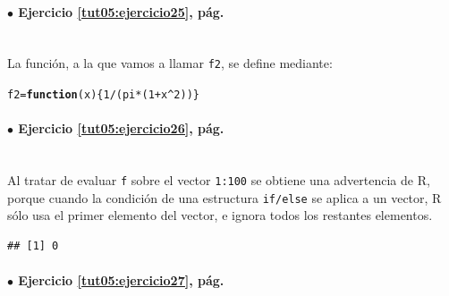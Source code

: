 \documentclass[10pt,a4paper]{article}\usepackage[]{graphicx}\usepackage[]{color}
\makeatletter
\newcommand{\hlnum}[1]{\textcolor[rgb]{0.686,0.059,0.569}{#1}}%
\newcommand{\hlopt}[1]{\textcolor[rgb]{0,0,0}{#1}}%
\newcommand{\hlstd}[1]{\textcolor[rgb]{0.345,0.345,0.345}{#1}}%
\newcommand{\hlkwa}[1]{\textcolor[rgb]{0.161,0.373,0.58}{\textbf{#1}}}%
\newcommand{\hlkwb}[1]{\textcolor[rgb]{0.69,0.353,0.396}{#1}}%
\newcommand{\hlkwc}[1]{\textcolor[rgb]{0.333,0.667,0.333}{#1}}%
\newenvironment{kframe}{%
 \def\at@end@of@kframe{}%
 \ifinner\ifhmode%
  \def\at@end@of@kframe{\end{minipage}}%
  \begin{minipage}{\columnwidth}%
 \fi\fi%
 \def\FrameCommand##1{\hskip\@totalleftmargin \hskip-\fboxsep
 \colorbox{shadecolor}{##1}\hskip-\fboxsep
     \hskip-\linewidth \hskip-\@totalleftmargin \hskip\columnwidth}%
 \MakeFramed {\advance\hsize-\width
   \@totalleftmargin\z@ \linewidth\hsize
   \@setminipage}}%
 {\par\unskip\endMakeFramed%
 \at@end@of@kframe}
\newenvironment{knitrout}{}{} %
\makeatother
\begin{document}
\paragraph{\bf $\bullet$ Ejercicio \ref{tut05:ejercicio25}, pág. \pageref{tut05:ejercicio25}}
\label{tut05:ejercicio25:sol}\quad\\

La función, a la que vamos a llamar {\tt f2}, se define mediante:
\begin{knitrout}
\color{fgcolor}\begin{kframe}
\begin{alltt}
\hlstd{f2} \hlkwb{=} \hlkwa{function}\hlstd{(}\hlkwc{x}\hlstd{)\{} \hlnum{1} \hlopt{/} \hlstd{(pi} \hlopt{*} \hlstd{(}\hlnum{1} \hlopt{+} \hlstd{x}\hlopt{^}\hlnum{2}\hlstd{))\}}
\end{alltt}
\end{kframe}
\end{knitrout}

\paragraph{\bf $\bullet$ Ejercicio \ref{tut05:ejercicio26}, pág. \pageref{tut05:ejercicio26}}
\label{tut05:ejercicio26:sol}\quad\\


Al tratar de evaluar {\tt f} sobre el vector {\tt 1:100} se obtiene una advertencia de R, porque cuando la condición de una estructura {\tt if/else}  se aplica a un vector, R sólo usa el primer elemento del vector, e ignora todos los restantes elementos.
\begin{knitrout}
\color{fgcolor}\begin{kframe}


{\ttfamily\noindent{}}\begin{verbatim}
## [1] 0
\end{verbatim}
\end{kframe}
\end{knitrout}

\paragraph{\bf $\bullet$ Ejercicio \ref{tut05:ejercicio27}, pág. \pageref{tut05:ejercicio27}}
\label{tut05:ejercicio27:sol}\quad\\
\end{document}
